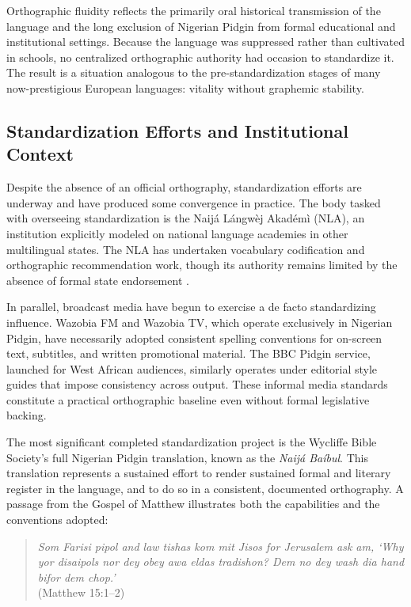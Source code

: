 \documentclass[12pt]{article}
\begin{document}
Orthographic fluidity reflects the primarily oral historical transmission of the language and the long exclusion of Nigerian Pidgin from formal educational and institutional settings. Because the language was suppressed rather than cultivated in schools, no centralized orthographic authority had occasion to standardize it. The result is a situation analogous to the pre-standardization stages of many now-prestigious European languages: vitality without graphemic stability.

\subsection{Standardization Efforts and Institutional Context}

Despite the absence of an official orthography, standardization efforts are underway and have produced some convergence in practice. The body tasked with overseeing standardization is the Naijá Lángwèj Akadémì (NLA), an institution explicitly modeled on national language academies in other multilingual states. The NLA has undertaken vocabulary codification and orthographic recommendation work, though its authority remains limited by the absence of formal state endorsement \cite{Ehondor2020}.

In parallel, broadcast media have begun to exercise a de facto standardizing influence. Wazobia FM and Wazobia TV, which operate exclusively in Nigerian Pidgin, have necessarily adopted consistent spelling conventions for on-screen text, subtitles, and written promotional material. The BBC Pidgin service, launched for West African audiences, similarly operates under editorial style guides that impose consistency across output. These informal media standards constitute a practical orthographic baseline even without formal legislative backing.

The most significant completed standardization project is the Wycliffe Bible Society's full Nigerian Pidgin translation, known as the \textit{Naijá Baíbul}. This translation represents a sustained effort to render sustained formal and literary register in the language, and to do so in a consistent, documented orthography. A passage from the Gospel of Matthew illustrates both the capabilities and the conventions adopted:

\begin{quote}
\textit{Som Farisi pipol and law tishas kom mit Jisos for Jerusalem ask am, `Why yor disaipols nor dey obey awa eldas tradishon? Dem no dey wash dia hand bifor dem chop.'} \\
(Matthew 15:1--2)
\end{quote}
\end{document}
